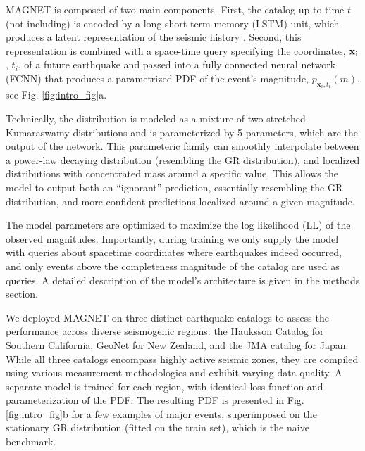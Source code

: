 \documentclass[pdflatex]{sn-jnl}
\begin{document}
MAGNET is composed of two main components. First, the catalog up to time $t$ (not including) is encoded by a long-short term memory (LSTM) unit, which produces a latent representation of the seismic history \cite{hochreiter_long_1997}.
Second, this representation is combined with a space-time query specifying the coordinates, $\bf{x}_i$, $t_i$, of a future earthquake and passed into a fully connected neural network (FCNN) that produces a parametrized PDF of the event's magnitude, $p_{\textbf{x}_i, t_i}(m)$, see Fig. \ref{fig:intro_fig}a. 

Technically, the distribution is modeled as a mixture of two stretched Kumaraswamy distributions \cite{kumaraswamy_generalized_1980} and is parameterized by 5 parameters, which are the output of the network. This parameteric family can  smoothly interpolate between a power-law decaying distribution (resembling the GR distribution), and localized distributions with concentrated mass around a specific value. This allows the model to output both an ``ignorant'' prediction, essentially resembling the GR distribution, and more confident predictions localized around a given magnitude.

The model parameters are optimized to maximize the log likelihood (LL) of the observed magnitudes. Importantly, during training we only supply the model with queries about spacetime coordinates where earthquakes indeed occurred, and only events above the completeness magnitude of the catalog are used as queries. A detailed description of the model's architecture is given in the methods section.


We deployed MAGNET on three distinct earthquake catalogs to assess the performance across diverse seismogenic regions: the Hauksson Catalog \cite{hauksson_waveform_2012} for Southern California, GeoNet \cite{gns_geonet_1970} for New Zealand, and the JMA catalog \cite{noauthor_japan_nodate-1} for Japan. While all three catalogs encompass highly active seismic zones, they are compiled using various measurement methodologies and exhibit varying data quality. A separate model is trained for each region, with identical loss function and parameterization of the PDF. The resulting PDF is presented in Fig. \ref{fig:intro_fig}b for a few examples of major events, superimposed on the stationary GR distribution (fitted on the train set), which is the naive benchmark.
\end{document}

